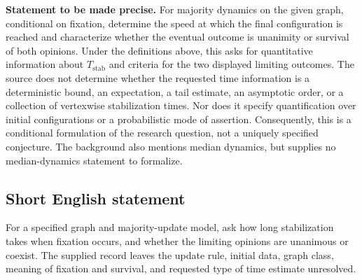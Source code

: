 \documentclass[11pt]{article}
\begin{document}
\textbf{Statement to be made precise.} For majority dynamics on the given graph, conditional on fixation, determine the speed at which the final configuration is reached and characterize whether the eventual outcome is unanimity or survival of both opinions. Under the definitions above, this asks for quantitative information about \(T_{\mathrm{stab}}\) and criteria for the two displayed limiting outcomes. The source does not determine whether the requested time information is a deterministic bound, an expectation, a tail estimate, an asymptotic order, or a collection of vertexwise stabilization times. Nor does it specify quantification over initial configurations or a probabilistic mode of assertion. Consequently, this is a conditional formulation of the research question, not a uniquely specified conjecture. The background also mentions median dynamics, but supplies no median-dynamics statement to formalize.
\subsection{Short English statement}
For a specified graph and majority-update model, ask how long stabilization takes when fixation occurs, and whether the limiting opinions are unanimous or coexist. The supplied record leaves the update rule, initial data, graph class, meaning of fixation and survival, and requested type of time estimate unresolved.
\end{document}
